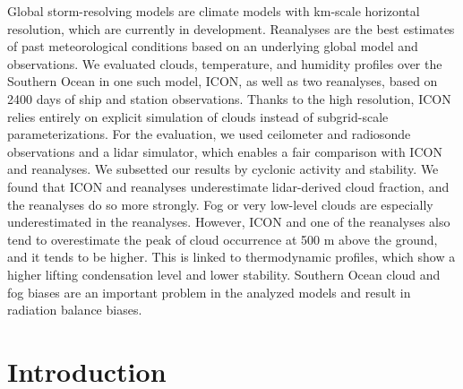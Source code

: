\documentclass[draft]{agujournal2019}
\begin{document}
Global storm-resolving models are climate models with km-scale horizontal resolution, which are currently in development. Reanalyses are the best estimates of past meteorological conditions based on an underlying global model and observations. We evaluated clouds, temperature, and humidity profiles over the Southern Ocean in one such model, ICON, as well as two reanalyses, based on 2400 days of ship and station observations. Thanks to the high resolution, ICON relies entirely on explicit simulation of clouds instead of subgrid-scale parameterizations. For the evaluation, we used ceilometer and radiosonde observations and a lidar simulator, which enables a fair comparison with ICON and reanalyses. We subsetted our results by cyclonic activity and stability. We found that ICON and reanalyses underestimate lidar-derived cloud fraction, and the reanalyses do so more strongly. Fog or very low-level clouds are especially underestimated in the reanalyses. However, ICON and one of the reanalyses also tend to overestimate the peak of cloud occurrence at 500 m above the ground, and it tends to be higher. This is linked to thermodynamic profiles, which show a higher lifting condensation level and lower stability. Southern Ocean cloud and fog biases are an important problem in the analyzed models and result in radiation balance biases.

\section{Introduction}
\label{sec:introduction}
\end{document}
